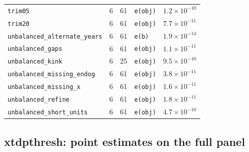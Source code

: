 \documentclass[10.5pt,a4paper]{article}
\begin{document}
\begin{longtable}{@{}p{3.6cm}rrp{4.9cm}r@{}}
\texttt{trim05} & 6 & 61 & \texttt{e(obj)} & $1.2\times10^{-10}$ \\
\texttt{trim20} & 6 & 61 & \texttt{e(obj)} & $7.7\times10^{-11}$ \\
\texttt{unbalanced\_\allowbreak{}alternate\_\allowbreak{}years} & 6 & 61 & \texttt{e(b)} & $1.9\times10^{-14}$ \\
\texttt{unbalanced\_\allowbreak{}gaps} & 6 & 61 & \texttt{e(obj)} & $1.1\times10^{-11}$ \\
\texttt{unbalanced\_\allowbreak{}kink} & 6 & 25 & \texttt{e(obj)} & $9.5\times10^{-10}$ \\
\texttt{unbalanced\_\allowbreak{}missing\_\allowbreak{}endog} & 6 & 61 & \texttt{e(obj)} & $3.8\times10^{-11}$ \\
\texttt{unbalanced\_\allowbreak{}missing\_\allowbreak{}x} & 6 & 61 & \texttt{e(obj)} & $1.6\times10^{-11}$ \\
\texttt{unbalanced\_\allowbreak{}refine} & 6 & 61 & \texttt{e(obj)} & $1.8\times10^{-11}$ \\
\texttt{unbalanced\_\allowbreak{}short\_\allowbreak{}units} & 6 & 61 & \texttt{e(obj)} & $4.7\times10^{-10}$ \\
\bottomrule
\end{longtable}

\subsection*{xtdpthresh: point estimates on the full panel}
\end{document}
